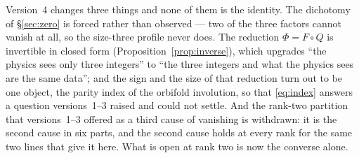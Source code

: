 \documentclass[11pt,a4paper]{article}
\begin{document}
Version~4 changes three things and none of them is the identity. The dichotomy of
\S\ref{sec:zero} is forced rather than observed --- two of the three factors cannot vanish at all,
so the size-three profile never does. The reduction $\Phi=F\circ Q$ is invertible in closed form
(Proposition~\ref{prop:inverse}),
which upgrades ``the physics sees only three integers'' to ``the three integers and what the
physics sees are the same data''; and the sign and the size of that reduction turn out to be one
object, the parity index of the orbifold involution, so that \eqref{eq:index} answers a question
versions~1--3 raised and could not settle. And the rank-two partition that versions~1--3 offered as a third
cause of vanishing is withdrawn: it is the second cause in six parts, and the second cause holds at
every rank for the same two lines that give it here. What is open at rank two is now the converse
alone.
\end{document}
